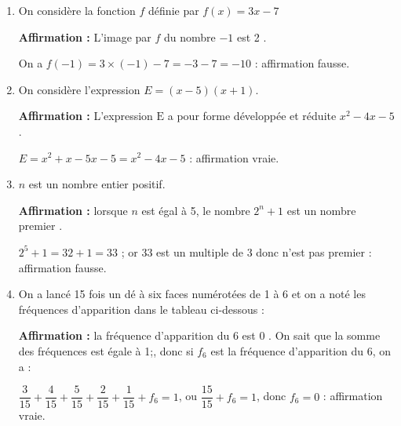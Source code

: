 

\medskip


\begin{enumerate}[itemsep=5mm]
	\item On considère la fonction $f$ définie par $f(x) = 3x - 7$
	
	\textbf{Affirmation  :} \og{}L’image par $f$ du nombre $-1$ est 2 \fg{}.
	
	On a $f(- 1) = 3 \times (- 1) - 7 = - 3 - 7 = - 10$ : affirmation fausse.
	
	\item On considère l'expression $E = (x - 5)(x + 1)$.
	
	\textbf{Affirmation  :} \og{} L'expression $ \mathrm{E} $ a pour forme développée et réduite $x^2 - 4x - 5 $\fg.
	
$E = x^2  + x - 5x - 5 = x^2 - 4x - 5$ : affirmation vraie.
	
	\item $n$ est un nombre entier positif.
	
	\textbf{Affirmation  :} \og{}lorsque $n$ est égal à 5, le nombre $2^n +1$ est un nombre premier \fg{}.

$2^5 + 1 = 32 + 1 = 33$ ; or 33 est un multiple de 3 donc n'est pas premier : affirmation fausse.	
	\item On a lancé 15 fois un dé à six faces numérotées de 1 à 6 et on a noté les fréquences d'apparition dans le tableau ci-dessous :
	
%	
	
	\textbf{Affirmation  :} \og{}la fréquence d'apparition du 6 est 0 \fg{}.
On sait que la somme des fréquences est égale à 1;, donc si $f_6$ est la fréquence d'apparition du 6, on a :

$\dfrac{3}{15} + \dfrac{4}{15} +\dfrac{5}{15} +\dfrac{2}{15} +\dfrac{1}{15} + f_6 = 1$, ou $\dfrac{15}{15} + f_6 = 1$, donc $f_6 = 0$ : affirmation vraie.
	

\end{enumerate}
